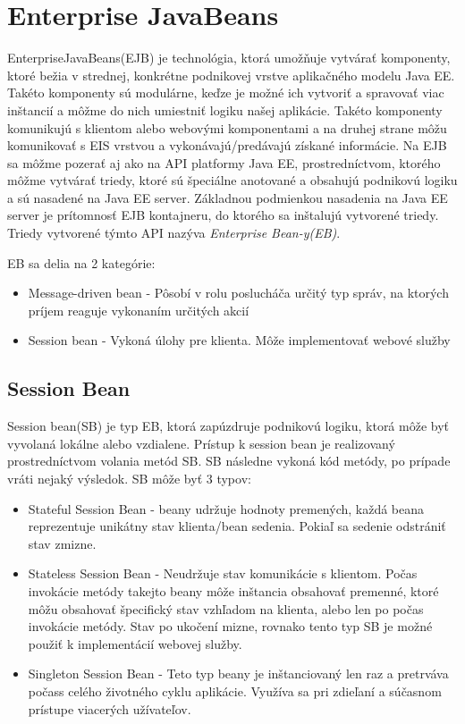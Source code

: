 \section{Enterprise JavaBeans}\label{ejbkap}
EnterpriseJavaBeans(EJB) je technológia, ktorá umožňuje vytvárať komponenty, ktoré bežia v strednej, konkrétne podnikovej vrstve aplikačného modelu Java EE. Takéto komponenty sú modulárne, keďze je možné ich vytvoriť a spravovať viac inštancií a môžme do nich umiestniť logiku našej aplikácie. Takéto komponenty komunikujú s klientom alebo webovými komponentami a na druhej strane môžu komunikovať s EIS vrstvou a vykonávajú/predávajú získané informácie. Na EJB sa môžme pozerať aj ako na API platformy Java EE, prostredníctvom, ktorého môžme vytvárať triedy, ktoré sú špeciálne anotované a obsahujú podnikovú logiku a sú nasadené na Java EE server. Základnou podmienkou nasadenia na Java EE server je prítomnosť EJB kontajneru, do ktorého sa inštalujú vytvorené triedy. Triedy vytvorené týmto API nazýva \emph{Enterprise Bean-y(EB)}.

EB sa delia na 2 kategórie:
\begin{itemize}
\item Message-driven bean -  Pôsobí v rolu poslucháča  určitý typ správ, na ktorých príjem reaguje vykonaním určitých akcií
\item Session bean - Vykoná úlohy pre klienta.  Môže implementovať webové služby\cite{fitweb}

\end{itemize}


\subsection{Session Bean}\label{sessionkap}
Session bean(SB) je typ EB, ktorá zapúzdruje podnikovú logiku, ktorá môže byť vyvolaná lokálne alebo vzdialene. Prístup k session bean je realizovaný prostredníctvom volania metód SB. SB následne vykoná kód metódy, po prípade vráti nejaký výsledok. \newline \indent SB môže byť 3 typov:
\begin{itemize}
\item Stateful Session Bean - beany udržuje hodnoty premených, každá beana reprezentuje unikátny stav klienta/bean sedenia. Pokiaľ sa sedenie odstrániť stav zmizne.
\item Stateless Session Bean - Neudržuje stav komunikácie s klientom. Počas invokácie metódy takejto beany môže inštancia obsahovať premenné, ktoré môžu obsahovať špecifický stav vzhľadom na klienta, alebo len po počas invokácie metódy. Stav po ukočení mizne, rovnako tento typ SB je možné použiť k implementácií webovej služby.
\item Singleton Session Bean - Teto typ beany je inštanciovaný len raz a pretrváva počass celého životného cyklu aplikácie. Využíva sa pri zdieľaní a súčasnom prístupe viacerých užívateľov.
\end{itemize}

